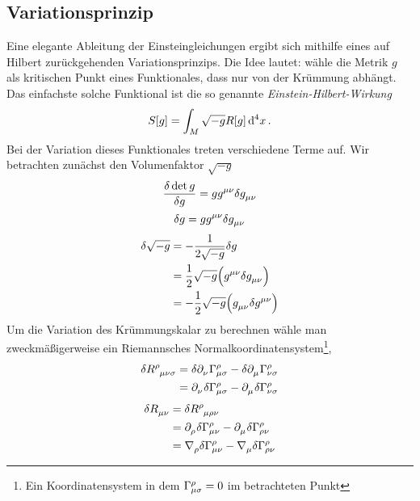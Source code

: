 \subsection{Variationsprinzip}
Eine elegante Ableitung der Einsteingleichungen ergibt sich mithilfe eines auf
Hilbert zurückgehenden Variationsprinzips. 
Die Idee lautet: wähle die Metrik $g$ als kritischen
Punkt eines Funktionales, dass nur von der Krümmung abhängt. Das
einfachste solche Funktional ist die so genannte
\emph{Einstein-Hilbert-Wirkung}
\begin{equation}
S[g]=\int_{M}\sqrt{-g}R[g] \dif{}^4x \,.
\end{equation}
Bei der Variation dieses Funktionales treten verschiedene Terme auf. Wir
betrachten zunächst den Volumenfaktor $\sqrt{-g}$
\begin{equation}
\frac{\delta \det g}{\delta g} = g 
\tensor{g}{^\mu^\nu}\delta\tensor{g}{_\mu_\nu}
\end{equation}
\begin{equation}
\delta g = g  \tensor{g}{^\mu^\nu}\delta\tensor{g}{_\mu_\nu}
\end{equation}
\begin{equation}
\begin{split}
\delta \sqrt{-g} 
&= -\frac{1}{2\sqrt{-g}}\delta g \\
&= \frac{1}{2} \sqrt{-g} \left(\tensor{g}{^\mu^\nu} \delta
\tensor{g}{_\mu_\nu}\right)\\
&= -\frac{1}{2} \sqrt{-g} \left(\tensor{g}{_\mu_\nu} \delta
\tensor{g}{^\mu^\nu}\right)
\end{split}
\end{equation}
Um die Variation des Krümmungskalar zu berechnen wähle man zweckmäßigerweise
ein Riemannsches Normalkoordinatensystem\footnote{Ein Koordinatensystem in dem
$\cSym{\rho}{\mu}{\sigma}=0$ im betrachteten Punkt},
\begin{equation}
\begin{split}
\delta \tensor{R}{^\rho_\mu_\nu_\sigma}
&=\delta \tensor{\partial}{_\nu}\cSym{\rho}{\mu}{\sigma}
-\delta \tensor{\partial}{_\mu}\cSym{\rho}{\nu}{\sigma}\\
&=\tensor{\partial}{_\nu}\delta \cSym{\rho}{\mu}{\sigma}
-\tensor{\partial}{_\mu}\delta \cSym{\rho}{\nu}{\sigma}\\
\end{split}
\end{equation}
\begin{equation}
\begin{split}
\delta \tensor{R}{_\mu_\nu}
&=\delta \tensor{R}{^\rho_\mu_\rho_\nu}\\
&=\tensor{\partial}{_\rho}\delta \cSym{\rho}{\mu}{\nu}
-\tensor{\partial}{_\mu}\delta \cSym{\rho}{\rho}{\nu}\\
&=\tensor{\nabla}{_\rho}\delta \cSym{\rho}{\mu}{\nu}
-\tensor{\nabla}{_\mu}\delta \cSym{\rho}{\rho}{\nu}\\
\end{split}
\end{equation}
